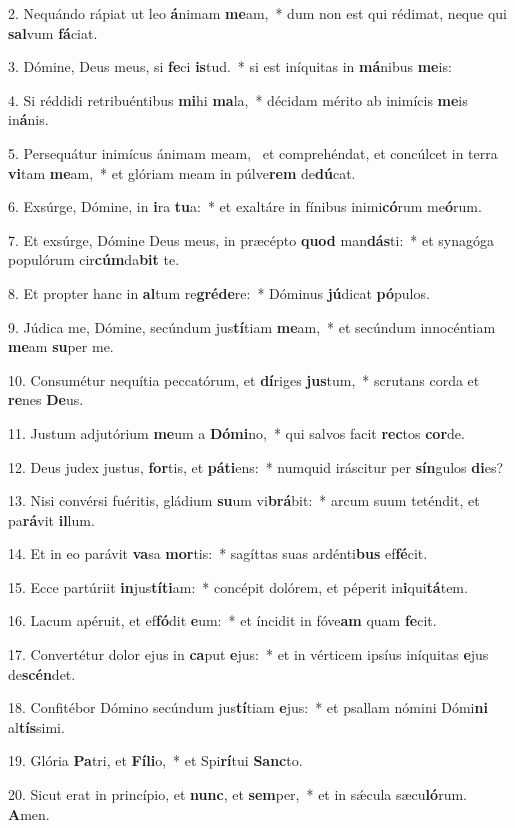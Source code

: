 2. Nequándo rápiat ut leo \textbf{á}nimam \textbf{me}am,~*  dum non est qui rédimat, neque qui \textbf{sal}vum \textbf{fá}ciat.\

3. Dómine, Deus meus, si \textbf{fe}ci \textbf{is}tud.~*  si est iníquitas in \textbf{má}nibus \textbf{me}is:\

4. Si réddidi retribuéntibus \textbf{mi}hi \textbf{ma}la,~*  décidam mérito ab inimícis \textbf{me}is in\textbf{á}nis.\

5. Persequátur inimícus ánimam meam, \dag\  et comprehéndat, et concúlcet in terra \textbf{vi}tam \textbf{me}am,~*  et glóriam meam in púlve\textbf{rem} de\textbf{dú}cat.\

6. Exsúrge, Dómine, in \textbf{i}ra \textbf{tu}a:~*  et exaltáre in fínibus inimi\textbf{có}rum me\textbf{ó}rum.\

7. Et exsúrge, Dómine Deus meus, in præcépto \textbf{quod} man\textbf{dás}ti:~*  et synagóga populórum cir\textbf{cúm}da\textbf{bit} te.\

8. Et propter hanc in \textbf{al}tum re\textbf{gré}\textbf{de}re:~*  Dóminus \textbf{jú}dicat \textbf{pó}pulos.\

9. Júdica me, Dómine, secúndum jus\textbf{tí}tiam \textbf{me}am,~*  et secúndum innocéntiam \textbf{me}am \textbf{su}per me.\

10. Consumétur nequítia peccatórum, et \textbf{dí}riges \textbf{jus}tum,~*  scrutans corda et \textbf{re}nes \textbf{De}us.\

11. Justum adjutórium \textbf{me}um a \textbf{Dó}\textbf{mi}no,~*  qui salvos facit \textbf{rec}tos \textbf{cor}de.\

12. Deus judex justus, \textbf{for}tis, et \textbf{pá}\textbf{ti}ens:~*  numquid iráscitur per \textbf{sín}gulos \textbf{di}es?\

13. Nisi convérsi fuéritis, gládium \textbf{su}um vi\textbf{brá}bit:~*  arcum suum teténdit, et pa\textbf{rá}vit \textbf{il}lum.\

14. Et in eo parávit \textbf{va}sa \textbf{mor}tis:~*  sagíttas suas ardénti\textbf{bus} ef\textbf{fé}cit.\

15. Ecce partúriit \textbf{in}jus\textbf{tí}\textbf{ti}am:~*  concépit dolórem, et péperit in\textbf{i}qui\textbf{tá}tem.\

16. Lacum apéruit, et ef\textbf{fó}dit \textbf{e}um:~*  et íncidit in fóve\textbf{am} quam \textbf{fe}cit.\

17. Convertétur dolor ejus in \textbf{ca}put \textbf{e}jus:~*  et in vérticem ipsíus iníquitas \textbf{e}jus de\textbf{scén}det.\

18. Confitébor Dómino secúndum jus\textbf{tí}tiam \textbf{e}jus:~*  et psallam nómini Dómi\textbf{ni} al\textbf{tís}simi.\

19. Glória \textbf{Pa}tri, et \textbf{Fí}\textbf{li}o,~*  et Spi\textbf{rí}tui \textbf{Sanc}to.\

20. Sicut erat in princípio, et \textbf{nunc}, et \textbf{sem}per,~*  et in sǽcula sæcu\textbf{ló}rum. \textbf{A}men.\


